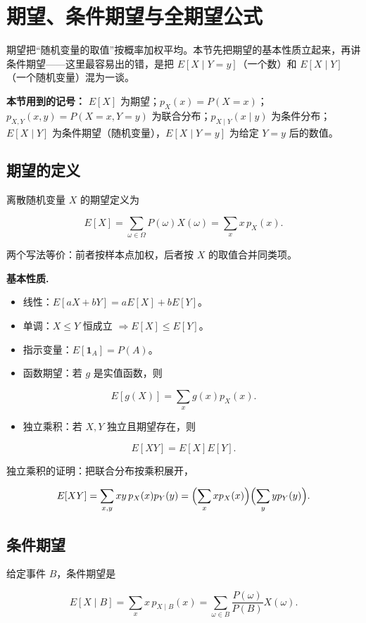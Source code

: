 \section{期望、条件期望与全期望公式}


期望把“随机变量的取值”按概率加权平均。本节先把期望的基本性质立起来，再讲条件期望——这里最容易出的错，是把 $E[X\mid Y=y]$（一个数）和 $E[X\mid Y]$（一个随机变量）混为一谈。

\textbf{本节用到的记号：} $E[X]$ 为期望；$p_X(x)=P(X=x)$；$p_{X,Y}(x,y)=P(X=x,Y=y)$ 为联合分布；$p_{X\mid Y}(x\mid y)$ 为条件分布；$E[X\mid Y]$ 为条件期望（随机变量），$E[X\mid Y=y]$ 为给定 $Y=y$ 后的数值。

\subsection{期望的定义}


离散随机变量 $X$ 的期望定义为

\[
E[X]=\sum_{\omega\in\Omega}P(\omega)X(\omega)
=\sum_{x}x\,p_X(x).
\]

两个写法等价：前者按样本点加权，后者按 $X$ 的取值合并同类项。

\textbf{基本性质.}

\begin{itemize}
\item 线性：$E[aX+bY]=aE[X]+bE[Y]$。
\item 单调：$X\le Y$ 恒成立 $\Rightarrow E[X]\le E[Y]$。
\item 指示变量：$E[\mathbf 1_A]=P(A)$。
\item 函数期望：若 $g$ 是实值函数，则
\end{itemize}

\[
  E[g(X)]=\sum_x g(x)p_X(x).
\]
\begin{itemize}
\item 独立乘积：若 $X,Y$ 独立且期望存在，则
\end{itemize}

\[
  E[XY]=E[X]E[Y].
\]

独立乘积的证明：把联合分布按乘积展开，

\[
E[XY]=\sum_{x,y}xy\,p_X(x)p_Y(y)
=\Bigl(\sum_x x p_X(x)\Bigr)\Bigl(\sum_y y p_Y(y)\Bigr).
\]

\subsection{条件期望}


给定事件 $B$，条件期望是

\[
E[X\mid B]=\sum_x x\,p_{X\mid B}(x)
=\sum_{\omega\in B}\frac{P(\omega)}{P(B)}X(\omega).
\]

